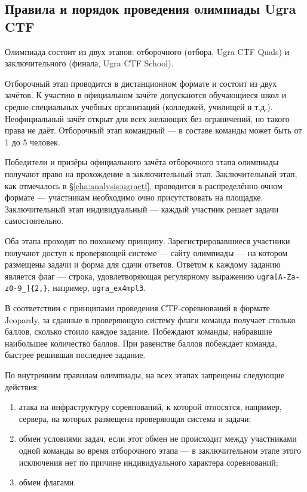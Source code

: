 \subsection{Правила и порядок проведения олимпиады Ugra CTF}

Олимпиада состоит из двух этапов: отборочного (отбора, Ugra CTF Quals) и заключительного (финала, Ugra CTF School).

Отборочный этап проводится в дистанционном формате и состоит из двух зачётов. К участию в официальном зачёте допускаются обучающиеся школ и средне-специальных учебных организаций (колледжей, училищей и т.д.). Неофициальный зачёт открыт для всех желающих без ограничений, но такого права не даёт. Отборочный этап командный — в составе команды может быть от 1 до 5 человек.

Победители и призёры официального зачёта отборочного этапа олимпиады получают право на прохождение в заключительный этап. Заключительный этап, как отмечалось в §\ref{cha:analysis:ugractf}, проводится в распределённо-очном формате — участникам необходимо очно присутствовать на площадке. Заключительный этап индивидуальный — каждый участник решает задачи самостоятельно.

Оба этапа проходят по похожему принципу. Зарегистрировавшиеся участники получают доступ к проверяющей системе — сайту олимпиады — на котором размещены задачи и форма для сдачи ответов. Ответом к каждому заданию является флаг — строка, удовлетворяющая регулярному выражению \texttt{ugra[A-Za-z0-9\_]\{2,\}}, например, \texttt{ugra\_ex4mpl3}.


В соответствии с принципами проведения CTF-соревнований в формате Jeopardy, за сданные в проверяющую систему флаги команда получает столько баллов, сколько стоило каждое задание. Побеждают команды, набравшие наибольшее количество баллов. При равенстве баллов побеждает команда, быстрее решившая последнее задание.

По внутренним правилам олимпиады, на всех этапах запрещены следующие действия:
\begin{enumerate}
\item атака на инфраструктуру соревнований, к которой относятся, например, сервера, на которых размещена проверяющая система и задачи;
\item обмен условиями задач, если этот обмен не происходит между участниками одной команды во время отборочного этапа — в заключительном этапе этого исключения нет по причине индивидуального характера соревнований;
\item обмен флагами.
\end{enumerate}

